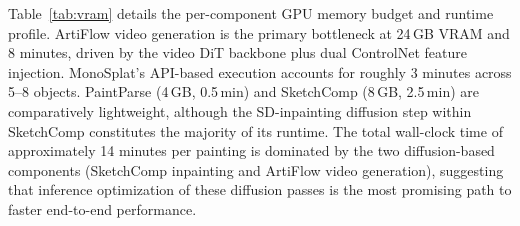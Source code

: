 Table~\ref{tab:vram} details the per-component GPU memory budget and runtime
profile. ArtiFlow video generation is the primary bottleneck at 24\,GB VRAM and
8 minutes, driven by the video DiT backbone plus dual ControlNet feature
injection. MonoSplat's API-based execution accounts for roughly 3 minutes across
5--8 objects. PaintParse (4\,GB, 0.5\,min) and SketchComp (8\,GB, 2.5\,min) are
comparatively lightweight, although the SD-inpainting diffusion step within
SketchComp constitutes the majority of its runtime. The total wall-clock time of
approximately 14 minutes per painting is dominated by the two diffusion-based
components (SketchComp inpainting and ArtiFlow video generation), suggesting
that inference optimization of these diffusion passes is the most promising path
to faster end-to-end performance.

\begin{table}[t]
\centering
\caption{\textbf{Per-component VRAM and runtime.} MonoSplat is API-based,
excluded from GPU VRAM.}
\label{tab:vram}
\end{table}
